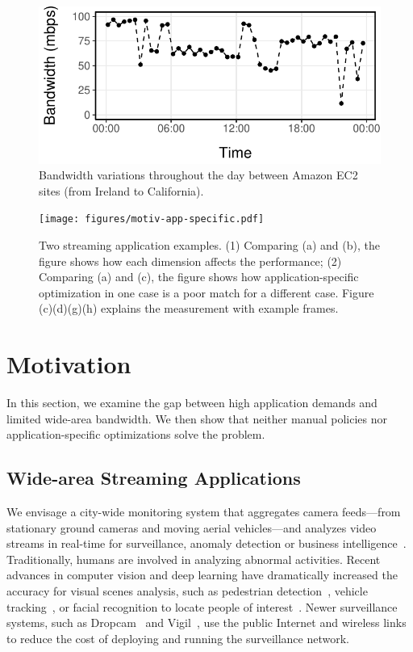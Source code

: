 \begin{figure}
  \centering
  \includegraphics[width=.9\linewidth]{figures/aws-variation.pdf}
  \caption{Bandwidth variations throughout the day between Amazon EC2 sites
    (from Ireland to California).}
  \label{fig:bw}
\end{figure}

\begin{figure}
  \centering
  \texttt{[image: figures/motiv-app-specific.pdf]}
  \caption{Two streaming application examples. (1) Comparing (a) and (b), the
    figure shows how each dimension affects the performance; (2) Comparing (a)
    and (c), the figure shows how application-specific optimization in one case
    is a poor match for a different case. Figure (c)(d)(g)(h) explains the
    measurement with example frames.}
  \label{fig:app-specific}
\end{figure}

\section{Motivation}
\label{sec:motivation}

In this section, we examine the gap between high application demands and limited
wide-area bandwidth. We then show that neither manual policies nor
application-specific optimizations solve the problem.

\subsection{Wide-area Streaming Applications}
\label{sec:wide-area-streaming}

 We envisage a city-wide monitoring system that
aggregates camera feeds---from stationary ground cameras and moving aerial
vehicles---and analyzes video streams in real-time for surveillance, anomaly
detection or business intelligence~\cite{oh2011large}. Traditionally, humans are
involved in analyzing abnormal activities. Recent advances in computer vision
and deep learning have dramatically increased the accuracy for visual scenes
analysis, such as pedestrian detection~\cite{dollar2012pedestrian}, vehicle
tracking~\cite{coifman1998real}, or facial recognition to locate people of
interest~\cite{parkhi2015deep, Lu:2015:SHF:2888116.2888245}. Newer surveillance
systems, such as Dropcam~\cite{dropcam} and Vigil~\cite{zhang2015design}, use
the public Internet and wireless links to reduce the cost of deploying and
running the surveillance network.

